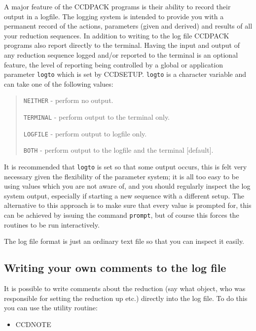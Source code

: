 \documentclass[twoside,11pt]{article}
\newcommand{\htmlref}[2]{#1}
\renewcommand{\_}{\texttt{\symbol{95}}}
\newenvironment{myquote}{\begin{quote}\begin{small}}{\end{small}\end{quote}}
\newcommand{\text}[1]{{\small \tt #1}}
\newcommand{\xroutine}[1]{\htmlref{{\sc #1}}{#1}}
\begin{document}
A major feature of the CCDPACK programs is their ability to record
their output in a logfile. The logging
system is intended to provide you with a permanent record of the
actions, parameters (given and derived) and results of all your
reduction sequences. In addition to writing to the log file CCDPACK
programs also report directly to the terminal.  Having the input and output of
any reduction sequence logged and/or reported to the terminal is an
optional feature, the level of reporting being controlled by a global
or application parameter \text{logto} which is set by
\xroutine{CCDSETUP}. \text{logto} is a character variable and can take
one of the following values:
\begin{myquote}
\begin{description}
\item \text{NEITHER} - perform no output.
\item \text{TERMINAL} - perform output to the terminal only.
\item \text{LOGFILE} - perform output to logfile only.
\item \text{BOTH} - perform output to the logfile and the terminal [default].
\end{description}
\end{myquote}
It is recommended that \text{logto} is set so that some output
occurs, this is felt very necessary given the flexibility of the
parameter system; it is all too easy to be using values which you are
not aware of, and you should regularly inspect the log system output,
especially if starting a new sequence with a different setup. The
alternative to this approach is to make sure that every value is
prompted for, this can be achieved by issuing the command
\text{prompt}, but of course this forces the routines to be run
interactively.

The log file format is just an ordinary text file so that you can inspect
it easily.

\subsection{Writing your own comments to the log file}

It is possible to write comments about the reduction (say what object,
who was responsible for setting the reduction up etc.) directly into the
log file. To do this you can use the utility routine:
\begin{itemize}
\item \xroutine{CCDNOTE}
\end{itemize}
\end{document}
